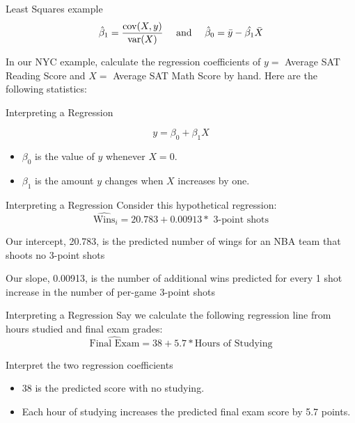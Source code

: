 \documentclass[aspectratio=169,t,11pt,table]{beamer}
\begin{document}
\begin{frame}{Least Squares example}
  \vspace*{-\bigskipamount}
  $$
    \hat{\beta}_1 = \frac{\cov(X, y)}{\var(X)} \quad\text{ and }\quad \hat{\beta}_0 = \bar{y} - \hat{\beta_1} \bar{X}
  $$

  In our NYC example, calculate the regression coefficients of $y = $ Average SAT Reading Score and $X = $ Average SAT Math Score by hand. Here are the following statistics:
  
  

  \pause
\end{frame}

\begin{frame}{Interpreting a Regression}

  $$
  y = \beta_0 + \beta_1 X
  $$

  \begin{itemize}
    \item $\beta_0$ is the value of $y$ whenever $X = 0$.
    
    \item $\beta_1$ is the amount $y$ changes when $X$ increases by one.
  \end{itemize}
\end{frame}

\begin{frame}{Interpreting a Regression}
  Consider this hypothetical regression:
  $$
    \hat{\text{Wins}}_i = 20.783 + 0.00913 * \text{ 3-point shots}
  $$
  
  \bigskip
  Our intercept, 20.783, is the predicted number of wings for an NBA team that shoots no 3-point shots
  
  \pause
  \bigskip
  Our slope, 0.00913, is the number of additional wins predicted for every 1 shot increase in the number of per-game 3-point shots
\end{frame}

\begin{frame}{Interpreting a Regression}
  Say we calculate the following regression line from hours studied and final exam grades:
  $$
    \widehat{\text{Final Exam}} = 38 + 5.7 * \text{Hours of Studying}
  $$

  Interpret the two regression coefficients
  \pause

  \begin{itemize}
    \item 38 is the predicted score with no studying.
    \pause
    \item Each hour of studying increases the predicted final exam score by 5.7 points.
  \end{itemize}
\end{frame}
\end{document}
